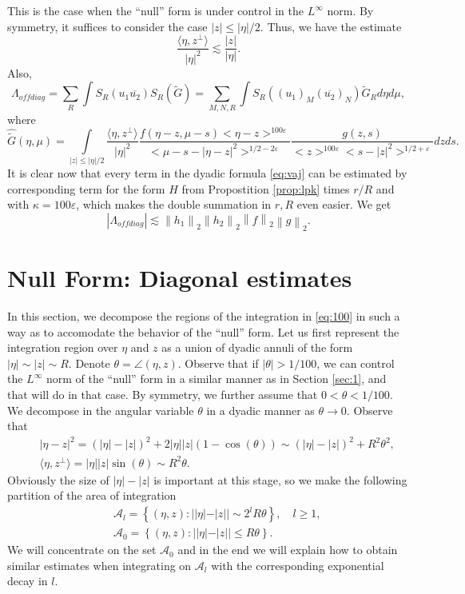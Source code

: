 \documentclass[draft,11pt,leqno]{amsart}
\newcommand{\q}{\quad}
\newcommand{\norm}[2]{{\left\| #1 \right\|}_{#2}}
\newcommand{\ve}{\varepsilon}
\newcommand{\ka}{\kappa}
\newcommand{\La}{\Lambda}
\newcommand{\ca}{\mathcal A}
\newcommand{\intl}{\int\limits}
\newcommand{\suml}{\sum\limits}
\newcommand{\f}{\displaystyle\frac}
\newcommand{\dpr}[2]{\langle #1, #2\rangle}
\begin{document}
\vspace{.5cm}

This is the case when the ``null'' form is under control in the $L^\infty$
norm. By symmetry, it suffices to consider the case $|z|\leq |\eta|/2$.
Thus, we have the estimate
$$
\f{\dpr{\eta}{z^{\bot}}}{|\eta|^2}\lesssim \f{|z|}
{|\eta|}.
$$
Also,
\begin{equation}
\label{eq:vaj}
\La_{off diag}=\suml_R\int S_R (u_1\overline{u_2}) S_R(\tilde{G})=\suml_{M,N,R}
\int S_R((u_1)_M (\overline{u_2})_N) \tilde{G}_R d\eta d\mu,
\end{equation}
where
$$
\widehat{\tilde{G}}(\eta,\mu)=\intl_{|z|\leq |\eta|/2}
\f{\dpr{\eta}{z^{\bot}}}{|\eta|^2}\f{f(\eta-z,\mu-s)
<\eta-z>^{100\ve}}
{<\mu-s-|\eta-z|^2>^{1/2-2\ve}}
 \f{g(z,s)}{<z>^{100\ve}
<s-|z|^2>^{1/2+\ve}}dz ds.
$$
It is clear now that every term in the dyadic formula \eqref{eq:vaj} 
 can be estimated by corresponding term for the form $H$ from
Propostition \ref{prop:lpk} times $r/R$ and with $\ka=100\ve$, which makes 
the double summation in $r,R$ even easier.
We get 
$$
|\La_{offdiag}|\lesssim 
\norm{h_1}{2}\norm{h_2}{2}\norm{f}{2}\norm{g}{2}.
$$

\section{Null Form: Diagonal estimates}
\label{sec:11}

\vspace{.5cm}

In this section, we decompose the regions of the integration in \eqref{eq:100}
in such a way as to accomodate the behavior of the ``null'' form.
Let us first represent the integration region over $\eta$ and $z$
as a union  of dyadic annuli of the form  $|\eta| \sim |z|\sim R$. 
Denote $\theta=\angle(\eta,z)$. Observe that if  $|\theta|>1/100$, 
we can control
the $L^\infty$ norm of the ``null'' form in a similar manner as 
in Section \ref{sec:1}, and
that will do in that case. By symmetry, we further assume  that 
$0<\theta<1/100$.
We decompose in the angular variable $\theta$ in a dyadic manner 
as $\theta\to 0$.
Observe that
\begin{eqnarray*}
& &|\eta-z|^2=(|\eta|-|z|)^2+2|\eta||z|(1-\cos(\theta))\sim (|\eta|-|z|)^2+R^2\theta^2,\\
& &\dpr{\eta}{z^{\bot}}=|\eta||z|\sin(\theta)\sim R^2\theta.
\end{eqnarray*}
Obviously the size of $|\eta|-|z|$ is important at this stage, so we make the following  partition
of the area of integration
\begin{eqnarray*}
& &\ca_l=\left\{ (\eta,z): ||\eta|-|z||\sim 2^l R\theta   \right\},\q   l\geq 1,\\
& &\ca_0=\left\{ (\eta,z): ||\eta|-|z||\leq  R\theta   \right\}.
\end{eqnarray*}
We will concentrate on the  set $\ca_0$ and in the end we will explain
how to obtain similar estimates
when integrating on $\ca_l$ with the corresponding exponential decay in $l$.
\end{document}

